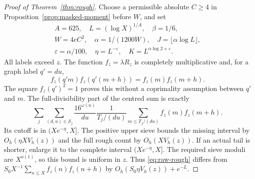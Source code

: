 \documentclass[11pt]{article}
\theoremstyle{definition}
\theoremstyle{remark}
\numberwithin{equation}{section}
\newcommand{\eps}{\varepsilon}
\begin{document}
\begin{proof}[Proof of Theorem~\ref{thm:rough}]
Choose a permissible absolute $C\ge4$ in Proposition~\ref{prop:masked-moment} before $W$, and set
\begin{equation}\label{eq:rough-parameters}
\begin{gathered}
 A=625,\quad L=(\log X)^{1/A},\quad\beta=1/6,\\
 W=4eC^2,\quad\alpha=1/(1200W),\quad J=\lfloor\alpha\log L\rfloor,\\
 \eps=\alpha/100,\quad\eta=L^{-\eps},\quad K=L^{\alpha\log2+\eps}.
\end{gathered}
\end{equation}
All labels exceed $z$. The function $f_z=\lambda R_z$ is completely multiplicative and, for a graph label $q'=du$,
\begin{equation}\label{eq:rough-dilation}
 f_z(q'm)f_z(q'(m+h))=f_z(m)f_z(m+h).
\end{equation}
The square $f_z(q')^2=1$ proves this without a coprimality assumption between $q'$ and $m$.
The full-divisibility part of the centred sum is exactly
\begin{equation}\label{eq:raw-rough}
 \sum_j\sum_{(d,u)\in\mathcal S_j}\frac{16^{\omega(u)}}{du}
 \frac1{T_j/(du)}\sum_{m\le T_j/(du)}f_z(m)f_z(m+h).
\end{equation}
Its cutoff is in $(Xe^{-\eta},X]$. The positive upper sieve bounds the missing interval by
$O_h(\eta XV_h(z))$ and the full rough count by $O_h(XV_h(z))$.
If an actual tail is shorter, enlarge it to the complete interval $(Xe^{-\eta},X]$.
The required sieve moduli are $X^{o(1)}$, so this bound is uniform in $z$.
Thus \eqref{eq:raw-rough} differs from $S_0X^{-1}\sum_{n\le X}f_z(n)f_z(n+h)$ by
$O_h(S_0\eta V_h(z))+e^{-L}$.


\end{proof}
\end{document}
